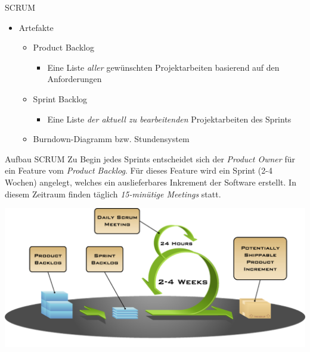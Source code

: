 \begin{defi}{SCRUM}
\begin{itemize}
              \begin{itemize}
                  \item Sprint-Planung
                  \item Sprint-Review
                  \item Sprint-Retrospektive
                  \item Tägliches 15-minütiges Scrum-Meeting
                        \begin{itemize}
                            \item Was hast du gestern getan?
                            \item Was wirst du heute tun?
                            \item Welche Hindernisse sind in deinem Weg?
                        \end{itemize}
              \end{itemize}
        \item Artefakte
              \begin{itemize}
                  \item Product Backlog
                        \begin{itemize}
                            \item Eine Liste \emph{aller} gewünschten Projektarbeiten basierend auf den Anforderungen
                        \end{itemize}
                  \item Sprint Backlog
                        \begin{itemize}
                            \item Eine Liste \emph{der aktuell zu bearbeitenden} Projektarbeiten des Sprints
                        \end{itemize}
                  \item Burndown-Diagramm bzw. Stundensystem
              \end{itemize}
    \end{itemize}
\end{defi}

\begin{bonus}{Aufbau SCRUM}
    Zu Begin jedes Sprints entscheidet sich der \emph{Product Owner} für ein Feature vom \emph{Product Backlog}.
    Für dieses Feature wird ein Sprint (2-4 Wochen) angelegt, welches ein auslieferbares Inkrement der Software erstellt.
    In diesem Zeitraum finden täglich \emph{15-minütige Meetings} statt.

    \includegraphics[width=\textwidth]{includes/figures/bonus_SCRUM.png}
\end{bonus}